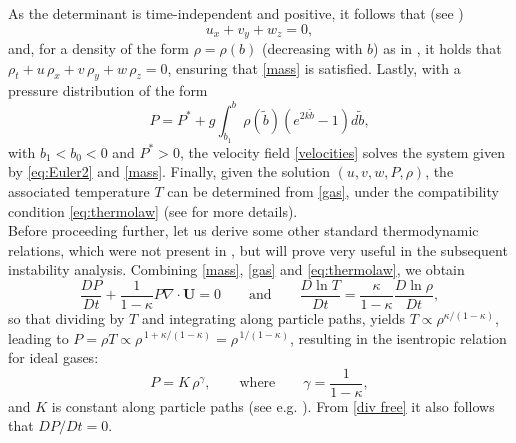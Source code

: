 \documentclass[reqno]{amsart}
\newcommand{\bu}{\mathbf{U}}             %
\begin{document}
As the determinant is time-independent and positive, it follows that (see \cite{C_Book})\begin{equation}\label{div free}
    u_x+v_y+w_z=0,
\end{equation}  and, for a density of the form $\rho=\rho(b)$ (decreasing with $b$) as in \cite{ConstantinMountain2023}, it holds that $\rho_t + u\,\rho_x + v\,\rho_y + w\,\rho_z=0$, ensuring that \eqref{mass} is satisfied. Lastly, with a pressure distribution of the form
\begin{equation}
    P=P^* + g \int_{b_1}^b \rho(\tilde{b})(e^{2k\tilde{b}}-1)d\tilde{b}, 
\end{equation}
with $b_1<b_0<0$ and $P^*>0$, the velocity field \eqref{velocities} solves the system given by \eqref{eq:Euler2} and \eqref{mass}. Finally, given the solution $(u,v,w,P,\rho)$, the associated temperature $T$ can be determined from \eqref{gas}, under the compatibility condition \eqref{eq:thermolaw} (see \cite{ConstantinMountain2023} for more details).\\
Before proceeding further, let us derive some other standard thermodynamic relations, which were not present in \cite{ConstantinMountain2023}, but will prove very useful in the subsequent instability analysis. Combining \eqref{mass}, \eqref{gas} and \eqref{eq:thermolaw}, we obtain
\begin{equation}
    \frac{D P}{Dt} + \frac{1}{1-\kappa} P \nabla\cdot \bu =0\qquad\text{and}\qquad
\frac{D\ln T}{Dt}=\frac{\kappa}{1-\kappa}\frac{D\ln\rho}{Dt},
\end{equation}
so that dividing by $T$ and integrating along particle paths, yields $
T \propto \rho^{\kappa/(1-\kappa)}$, leading to
$P=\rho T \propto \rho^{\,1+\kappa/(1-\kappa)}=\rho^{\,1/(1-\kappa)}$, resulting in the isentropic relation for ideal gases:
\begin{equation}\label{isentropic}
   P=K\,\rho^\gamma, \qquad\text{where} \qquad \gamma=\frac{1}{1-\kappa},
\end{equation}
and $K$ is constant along particle paths (see e.g. \cite{cengel}). From \eqref{div free} it also follows that ${DP}/{Dt}=0.$
\end{document}
